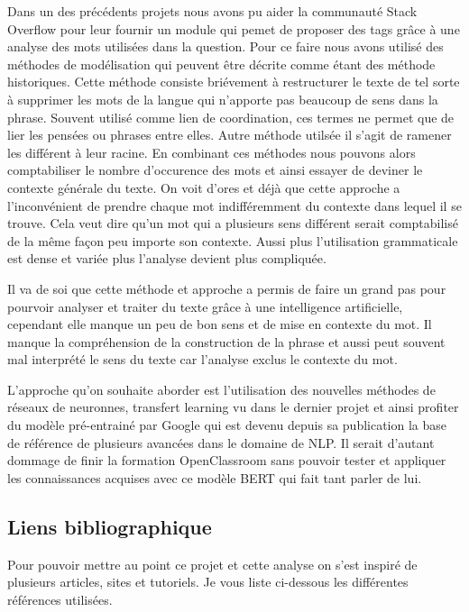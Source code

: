 \documentclass[8pt]{article}
\begin{document}
    Dans un des précédents projets nous avons pu aider la communauté Stack
Overflow pour leur fournir un module qui pemet de proposer des tags
grâce à une analyse des mots utilisées dans la question. Pour ce faire
nous avons utilisé des méthodes de modélisation qui peuvent être décrite
comme étant des méthode historiques. Cette méthode consiste briévement à
restructurer le texte de tel sorte à supprimer les mots de la langue qui
n'apporte pas beaucoup de sens dans la phrase. Souvent utilisé comme
lien de coordination, ces termes ne permet que de lier les pensées ou
phrases entre elles. Autre méthode utilsée il s'agit de ramener les
différent à leur racine. En combinant ces méthodes nous pouvons alors
comptabiliser le nombre d'occurence des mots et ainsi essayer de deviner
le contexte générale du texte. On voit d'ores et déjà que cette approche
a l'inconvénient de prendre chaque mot indifféremment du contexte dans
lequel il se trouve. Cela veut dire qu'un mot qui a plusieurs sens
différent serait comptabilisé de la même façon peu importe son contexte.
Aussi plus l'utilisation grammaticale est dense et variée plus l'analyse
devient plus compliquée.

    Il va de soi que cette méthode et approche a permis de faire un grand
pas pour pourvoir analyser et traiter du texte grâce à une intelligence
artificielle, cependant elle manque un peu de bon sens et de mise en
contexte du mot. Il manque la compréhension de la construction de la
phrase et aussi peut souvent mal interprété le sens du texte car
l'analyse exclus le contexte du mot.

    L'approche qu'on souhaite aborder est l'utilisation des nouvelles
méthodes de réseaux de neuronnes, transfert learning vu dans le dernier
projet et ainsi profiter du modèle pré-entrainé par Google qui est
devenu depuis sa publication la base de référence de plusieurs avancées
dans le domaine de NLP. Il serait d'autant dommage de finir la formation
OpenClassroom sans pouvoir tester et appliquer les connaissances
acquises avec ce modèle BERT qui fait tant parler de lui.

    \hypertarget{liens-bibliographique}{%
\subsection{Liens bibliographique}\label{liens-bibliographique}}

   Pour pouvoir mettre au point ce projet et cette analyse on s'est inspiré de plusieurs articles, sites et tutoriels. Je vous liste ci-dessous les différentes références utilisées.
\end{document}
